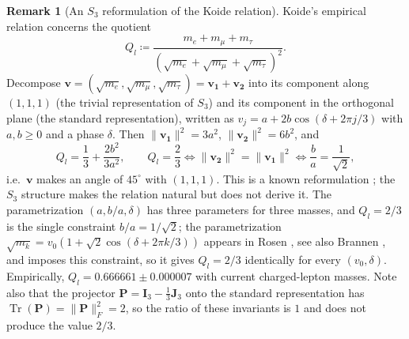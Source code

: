 \documentclass[11pt,a4paper,reqno]{amsart}
\theoremstyle{definition}
\newtheorem{remark}[theorem]{Remark}
\numberwithin{equation}{section}
\newcommand{\Tr}{\operatorname{Tr}}
\begin{document}
\begin{remark}[An $S_3$ reformulation of the Koide relation]
\label{thm:koide_derivation}
Koide's empirical relation \cite{koide1982fermion, koide1983fermion} concerns the quotient
\begin{equation}
    Q_l \coloneqq \frac{m_e + m_\mu + m_\tau}{\left(\sqrt{m_e} + \sqrt{m_\mu} + \sqrt{m_\tau}\right)^2}.
\end{equation}
Decompose $\mathbf{v} = (\sqrt{m_e}, \sqrt{m_\mu}, \sqrt{m_\tau}) = \mathbf{v}_{\mathbf{1}} + \mathbf{v}_{\mathbf{2}}$ into its component along $(1,1,1)$ (the trivial representation of $S_3$) and its component in the orthogonal plane (the standard representation), written as $v_j = a + 2b\cos(\delta + 2\pi j/3)$ with $a, b \ge 0$ and a phase $\delta$. Then $\|\mathbf{v}_{\mathbf{1}}\|^2 = 3a^2$, $\|\mathbf{v}_{\mathbf{2}}\|^2 = 6b^2$, and
\begin{equation}
    \label{eq:koide_exact}
    Q_l = \frac{1}{3} + \frac{2b^2}{3a^2}, \qquad Q_l = \frac{2}{3} \iff \|\mathbf{v}_{\mathbf{2}}\|^2 = \|\mathbf{v}_{\mathbf{1}}\|^2 \iff \frac{b}{a} = \frac{1}{\sqrt{2}},
\end{equation}
i.e.\ $\mathbf{v}$ makes an angle of $45^\circ$ with $(1,1,1)$. This is a known reformulation \cite{foot1994note}; the $S_3$ structure makes the relation natural but does not derive it. The parametrization $(a, b/a, \delta)$ has three parameters for three masses, and $Q_l = 2/3$ is the single constraint $b/a = 1/\sqrt{2}$; the parametrization $\sqrt{m_k} = v_0 (1 + \sqrt{2} \cos(\delta + 2\pi k/3))$ appears in Rosen \cite{rosen2007heuristic}, see also Brannen \cite{brannen2010spin}, and imposes this constraint, so it gives $Q_l = 2/3$ identically for every $(v_0, \delta)$. Empirically, $Q_l = 0.666661 \pm 0.000007$ with current charged-lepton masses. Note also that the projector $\mathbf{P} = \mathbf{I}_3 - \frac{1}{3}\mathbf{J}_3$ onto the standard representation has $\Tr(\mathbf{P}) = \|\mathbf{P}\|_F^2 = 2$, so the ratio of these invariants is $1$ and does not produce the value $2/3$.
\end{remark}
\end{document}

